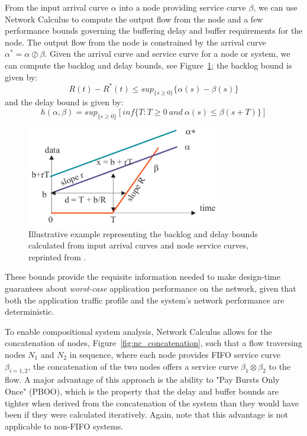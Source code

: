 From the input arrival curve $\alpha$ into a node providing service
curve $\beta$, we can use Network Calculus to compute the output flow
from the node and a few performance bounds governing the buffering
delay and buffer requirements for the node.  The output flow from the
node is constrained by the arrival curve $\alpha^* =
\alpha\oslash\beta$.  Given the arrival curve and service curve for a
node or system, we can compute the backlog and delay bounds, see
Figure~\ref{fig:nc_bounds}; the backlog bound is given by:
\begin{equation}
  R(t)-R^*(t)\leq sup_{\{s\geq 0\}}\{\alpha(s)-\beta(s)\}
\end{equation}
and the delay bound is given by: 
\begin{equation}
  h(\alpha,\beta)=sup_{\{s\geq0\}}[inf\{T:T\geq0\ and\ \alpha(s)\leq\beta(s+T)\}]
\end{equation}

\begin{figure}[htb]
  \centering
  \includegraphics[width=0.75\textwidth]{figs/nc_bounds.png}
  \caption{Illustrative example representing the backlog and delay
    bounds calculated from input arrival curves and node service
    curves, reprinted from \cite{NCBook}.}
  \label{fig:nc_bounds}
\end{figure}

These bounds provide the requisite information needed to make
design-time guarantees about \emph{worst-case} application performance
on the network, given that both the application traffic profile and
the system's network performance are deterministic.

To enable compositional system analysis, Network Calculus allows for
the concatenation of nodes, Figure~\ref{fig:nc_concatenation}, such
that a flow traversing nodes $N_1$ and $N_2$ in sequence, where each
node provides FIFO service curve $\beta_{i=1,2}$, the concatenation of
the two nodes offers a service curve $\beta_1\otimes\beta_2$ to the
flow.  A major advantage of this approach is the ability to "Pay
Bursts Only Once" (PBOO), which is the property that the delay and
buffer bounds are tighter when derived from the concatenation of the
system than they would have been if they were calculated iteratively.
Again, note that this advantage is not applicable to non-FIFO
systems\cite{NCBook}.

